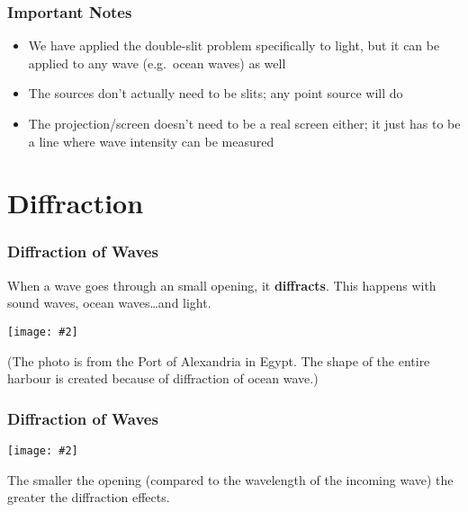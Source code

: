 \documentclass[compress,aspectratio=169]{beamer}
\newcommand{\pic}[2]{\texttt{[image: \#2]}}
\begin{document}
\begin{frame}
  \frametitle{Important Notes}
  \begin{itemize}
  \item We have applied the double-slit problem specifically to light, but it
    can be applied to any wave (e.g.\ ocean waves) as well
  \item The sources don't actually need to be slits; any point source will do
  \item The projection/screen doesn't need to be a real screen either; it just
    has to be a line where wave intensity can be measured
  \end{itemize}
\end{frame}



\section{Diffraction}

\begin{frame}
  \frametitle{Diffraction of Waves}
  When a wave goes through an small opening, it \textbf{diffracts}. This happens
  with sound waves, ocean waves\ldots and light.
  \begin{center}
    \pic{0.6}{graphics/alexandria.jpg}
  \end{center}
  (The photo is from the Port of Alexandria in Egypt. The shape of the entire
  harbour is created because of diffraction of ocean wave.)
\end{frame}

\begin{frame}
  \frametitle{Diffraction of Waves}
  \begin{center}
    \pic{0.6}{graphics/diffraction1.jpg}
  \end{center}
  The smaller the opening (compared to the wavelength of the incoming wave)
  the greater the diffraction effects.
\end{frame}
\end{document}

